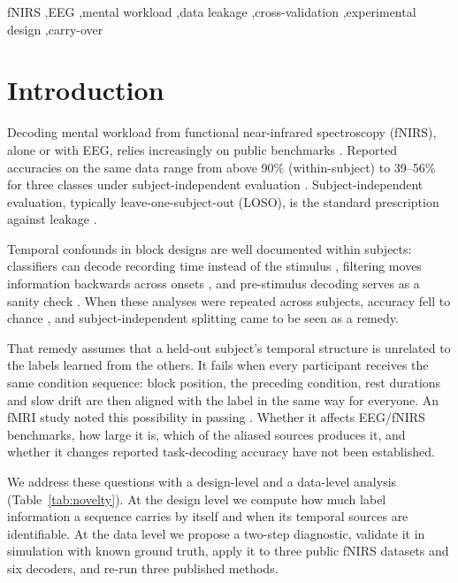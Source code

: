 \documentclass[preprint,11pt]{elsarticle}
\begin{document}
\begin{frontmatter}
\begin{keyword}
fNIRS \sep EEG \sep mental workload \sep data leakage \sep cross-validation \sep experimental design \sep carry-over
\end{keyword}

\end{frontmatter}
\linenumbers

\section{Introduction}
\label{sec:intro}

Decoding mental workload from functional near-infrared spectroscopy (fNIRS), alone or with EEG, relies increasingly on public benchmarks \citep{shin2018,huang2021,chen2023}. Reported accuracies on the same data range from above 90\% (within-subject) to 39--56\% for three classes under subject-independent evaluation \citep{benerradi2023,khan2026}. Subject-independent evaluation, typically leave-one-subject-out (LOSO), is the standard prescription against leakage \citep{brookshire2024}.

Temporal confounds in block designs are well documented within subjects: classifiers can decode recording time instead of the stimulus \citep{li2021,ahmed2022,xu2026}, filtering moves information backwards across onsets \citep{vandriel2021}, and pre-stimulus decoding serves as a sanity check \citep{grootswagers2017}. When these analyses were repeated across subjects, accuracy fell to chance \citep{li2021,ahmed2022,xu2026}, and subject-independent splitting came to be seen as a remedy.

That remedy assumes that a held-out subject's temporal structure is unrelated to the labels learned from the others. It fails when every participant receives the same condition sequence: block position, the preceding condition, rest durations and slow drift are then aligned with the label in the same way for everyone. An fMRI study noted this possibility in passing \citep{barbu2015}. Whether it affects EEG/fNIRS benchmarks, how large it is, which of the aliased sources produces it, and whether it changes reported task-decoding accuracy have not been established.

We address these questions with a design-level and a data-level analysis (Table~\ref{tab:novelty}). At the design level we compute how much label information a sequence carries by itself and when its temporal sources are identifiable. At the data level we propose a two-step diagnostic, validate it in simulation with known ground truth, apply it to three public fNIRS datasets and six decoders, and re-run three published methods.
\end{document}

